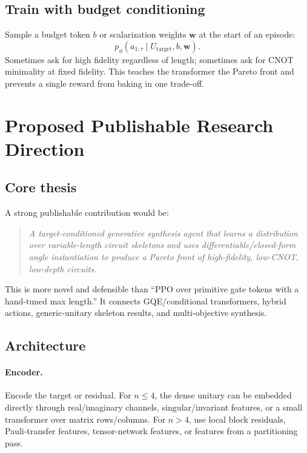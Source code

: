 \documentclass[11pt,a4paper]{article}
\newcommand{\Utarget}{U_{\mathrm{target}}}
\begin{document}
\subsection{Train with budget conditioning}

Sample a budget token $b$ or scalarization weights $\bm{w}$ at the start of an
episode:
\[
  p_\phi(a_{1:\tau}\mid \Utarget, b,\bm{w}).
\]
Sometimes ask for high fidelity regardless of length; sometimes ask for CNOT
minimality at fixed fidelity. This teaches the transformer the Pareto front and
prevents a single reward from baking in one trade-off.

\section{Proposed Publishable Research Direction}

\subsection{Core thesis}

A strong publishable contribution would be:

\begin{quote}
\emph{A target-conditioned generative synthesis agent that learns a distribution
over variable-length circuit skeletons and uses differentiable/closed-form
angle instantiation to produce a Pareto front of high-fidelity, low-CNOT,
low-depth circuits.}
\end{quote}

This is more novel and defensible than ``PPO over primitive gate tokens with a
hand-tuned max length.'' It connects GQE/conditional transformers, hybrid
actions, generic-unitary skeleton results, and multi-objective synthesis.

\subsection{Architecture}

\paragraph{Encoder.}
Encode the target or residual. For $n\le4$, the dense unitary can be embedded
directly through real/imaginary channels, singular/invariant features, or a
small transformer over matrix rows/columns. For $n>4$, use local block
residuals, Pauli-transfer features, tensor-network features, or features from
a partitioning pass.
\end{document}
